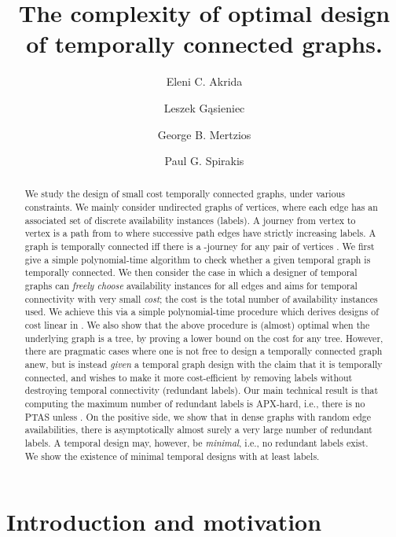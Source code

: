 \documentclass[a4paper,UKenglish]{article}
\title{The complexity of optimal design of temporally connected graphs.}
\author[1]{Eleni C. Akrida}
\author[1]{Leszek G\k{a}sieniec}
\author[2]{George B. Mertzios}
\author[1]{Paul G. Spirakis}
\affil[1]{Department of Computer Science, University of Liverpool, UK\\
  \texttt{\{Eleni.Akrida,L.A.Gasieniec,P.Spirakis\}@liverpool.ac.uk}}
\affil[2]{School of Engineering and Computing Sciences, Durham University, UK\\
  \texttt{George.Mertzios@durham.ac.uk}}
\begin{document}
\maketitle

\begin{abstract}
We study the design of small cost temporally connected graphs, under various constraints. We mainly consider undirected graphs of  vertices, where each edge has an associated set of discrete availability instances (labels). A journey from vertex  to vertex  is a path from  to  where successive path edges have strictly increasing labels. A graph is temporally connected iff there is a -journey for any pair of vertices . We first give a simple polynomial-time algorithm to check whether a given temporal graph is temporally connected. We then consider the case in which a designer of temporal graphs can \emph{freely choose} availability instances for all edges and aims for temporal connectivity with very small \emph{cost}; the cost is the total number of availability instances used. We achieve this via a simple polynomial-time procedure which derives designs of cost linear in . We also show that the above procedure is (almost) optimal when the underlying graph is a tree, by proving a lower bound on the cost for any tree. However, there are pragmatic cases where one is not free to design a temporally connected graph anew, but is instead \emph{given} a temporal graph design with the claim that it is temporally connected, and wishes to make it more cost-efficient by removing labels without destroying temporal connectivity (redundant  labels).
Our main technical result is that computing the maximum number of redundant labels is APX-hard, i.e., there is no PTAS unless . On the positive side, we show that in dense graphs with random edge availabilities, there is asymptotically almost surely a very large number of  redundant labels. A temporal design may, however, be \emph{minimal}, i.e., no redundant labels exist. We show the existence of minimal temporal designs with at least  labels.
\end{abstract}

\section{Introduction and motivation}
\end{document}
